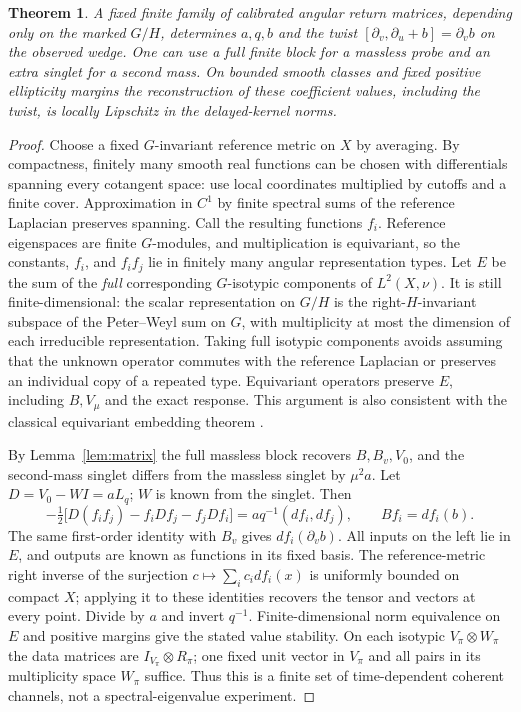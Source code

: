 \documentclass[11pt]{article}
\newtheorem{theorem}{Theorem}
\begin{document}
\begin{theorem}\label{thm:homog}
A fixed finite family of calibrated angular return matrices, depending only on the marked \(G/H\), determines \(a,q,b\) and the twist \([\partial_v,\partial_u+b]=\partial_v b\) on the observed wedge. One can use a full finite block for a massless probe and an extra singlet for a second mass. On bounded smooth classes and fixed positive ellipticity margins the reconstruction of these coefficient values, including the twist, is locally Lipschitz in the delayed-kernel norms.
\end{theorem}
\begin{proof}
Choose a fixed \(G\)-invariant reference metric on \(X\) by averaging. By compactness, finitely many smooth real functions can be chosen with differentials spanning every cotangent space: use local coordinates multiplied by cutoffs and a finite cover. Approximation in \(C^1\) by finite spectral sums of the reference Laplacian preserves spanning. Call the resulting functions \(f_i\). Reference eigenspaces are finite \(G\)-modules, and multiplication is equivariant, so the constants, \(f_i\), and \(f_if_j\) lie in finitely many angular representation types. Let \(E\) be the sum of the \emph{full} corresponding \(G\)-isotypic components of \(L^2(X,\nu)\). It is still finite-dimensional: the scalar representation on \(G/H\) is the right-\(H\)-invariant subspace of the Peter--Weyl sum on \(G\), with multiplicity at most the dimension of each irreducible representation. Taking full isotypic components avoids assuming that the unknown operator commutes with the reference Laplacian or preserves an individual copy of a repeated type. Equivariant operators preserve \(E\), including \(B,V_\mu\) and the exact response. This argument is also consistent with the classical equivariant embedding theorem \cite{Mostow,Palais}.

By Lemma~\ref{lem:matrix} the full massless block recovers \(B,B_v,V_0\), and the second-mass singlet differs from the massless singlet by \(\mu^2 a\). Let \(D=V_0-WI=aL_q\); \(W\) is known from the singlet. Then
\[
 -\tfrac12\big[D(f_i f_j)-f_i D f_j-f_j D f_i\big]
 =a q^{-1}(df_i,df_j),\qquad B f_i=df_i(b).
\]
The same first-order identity with \(B_v\) gives \(df_i(\partial_vb)\). All inputs on the left lie in \(E\), and outputs are known as functions in its fixed basis. The reference-metric right inverse of the surjection \(c\mapsto\sum_i c_i df_i(x)\) is uniformly bounded on compact \(X\); applying it to these identities recovers the tensor and vectors at every point. Divide by \(a\) and invert \(q^{-1}\). Finite-dimensional norm equivalence on \(E\) and positive margins give the stated value stability. On each isotypic \(V_\pi\otimes W_\pi\) the data matrices are \(I_{V_\pi}\otimes R_\pi\); one fixed unit vector in \(V_\pi\) and all pairs in its multiplicity space \(W_\pi\) suffice. Thus this is a finite set of time-dependent coherent channels, not a spectral-eigenvalue experiment.
\end{proof}
\end{document}
